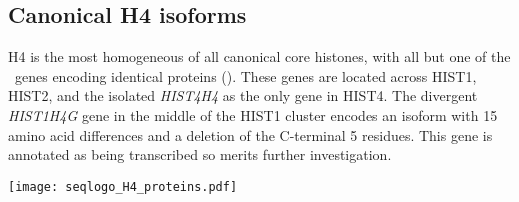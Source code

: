   \subsection{Canonical H4 isoforms}
    H4 is the most homogeneous of all canonical core histones,
    with all but one of the \HFourCodingGenes{}~genes encoding
    identical proteins ().
    These genes are located across HIST1, HIST2, and the isolated
    \textit{HIST4H4} as the only gene in HIST4.
    The divergent \textit{HIST1H4G} gene in the middle of the HIST1 cluster
    encodes an isoform with 15 amino acid differences and a deletion of the C-terminal 5 residues.
    This gene is annotated as being transcribed so merits further investigation.

    \begin{table}
      \caption{%
        Canonical H4 protein isoforms.  Upper panel shows isoforms
        relative to the most common protein sequence.  Lower panel
        shows sequence logo of all isoforms aligned with invariant
        residues in grey.
      }
      \label{tab:H4-consensus}
      
      \texttt{[image: seqlogo\_H4\_proteins.pdf]}
    \end{table}
